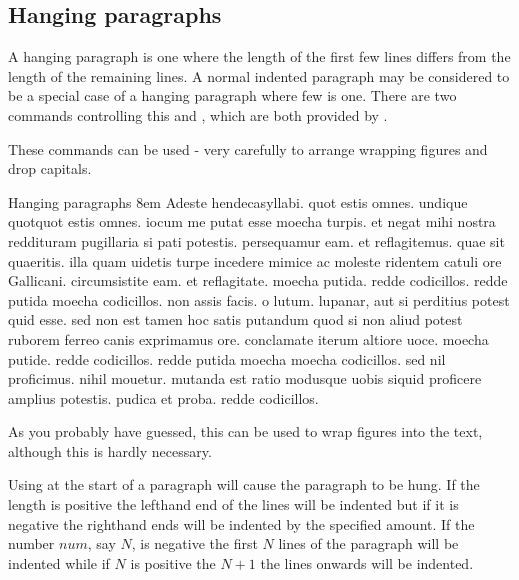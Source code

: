 \subsection{Hanging paragraphs}
                                                                                                  \begin{macro}{\hangafter}
\begin{macro}{\hangindent}
A hanging paragraph is one where the length of the first few lines differs from the length
of the remaining lines. A normal indented paragraph may be considered to be a special case of a hanging paragraph where few is one. There are two commands controlling this  and , which are both provided by \tex.
\end{macro}
\end{macro}


These commands can be used - very carefully to arrange wrapping figures
and drop capitals. 

\begin{texexample}{Hanging paragraphs}{}
\hangindent 8em    \footnotesize
Adeste hendecasyllabi. quot estis 
omnes. undique quotquot estis omnes. 
iocum me putat esse moecha turpis. 
et negat mihi nostra reddituram 
pugillaria si pati potestis. 
persequamur eam. et reflagitemus. 
quae sit quaeritis. illa quam uidetis 
turpe incedere mimice ac moleste 
ridentem catuli ore Gallicani. 
circumsistite eam. et reflagitate. 
moecha putida. redde codicillos. 
redde putida moecha codicillos. 
non assis facis. o lutum. lupanar, 
aut si perditius potest quid esse. 
sed non est tamen hoc satis putandum 
quod si non aliud potest ruborem 
ferreo canis exprimamus ore. 
conclamate iterum altiore uoce. 
moecha putide. redde codicillos. 
redde putida moecha moecha codicillos. 
sed nil proficimus. nihil mouetur. 
mutanda est ratio modusque uobis 
siquid proficere amplius potestis. 
pudica et proba. redde codicillos.

\end{texexample}


As you probably have guessed, this can be used to wrap figures into the text, although this is hardly necessary. 

Using  at the start of a paragraph will cause the paragraph to be hung.
If the length  is positive the lefthand end of the lines will be indented but
if it is negative the righthand ends will be indented by the specified amount. If the
number $num$, say $N$, is negative the first $N$ lines of the paragraph will be indented while
if $N$ is positive the $N+1$ the lines onwards will be indented. 

